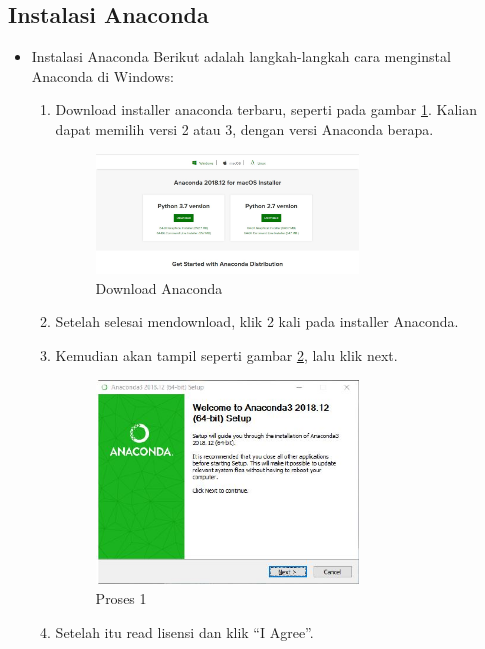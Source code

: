 \subsection{Instalasi Anaconda}
\begin{itemize}
\item Instalasi Anaconda
Berikut adalah langkah-langkah cara menginstal Anaconda di Windows:
\begin{enumerate}
\item Download installer anaconda terbaru, seperti pada gambar \ref{downloadanaconda}. Kalian dapat memilih versi 2 atau 3, dengan versi Anaconda berapa.
\begin{figure}[ht]
	\centerline{\includegraphics[width=0.70\textwidth]{figures/1/1154121/DownloadAnaconda.JPG}}
	\caption{Download Anaconda}
	\label{downloadanaconda}
\end{figure}	
\item Setelah selesai mendownload, klik 2 kali pada installer Anaconda.
\item Kemudian akan tampil seperti gambar \ref{gambar1}, lalu klik next.
\begin{figure}[ht]
	\centerline{\includegraphics[width=0.70\textwidth]{figures/1/1154121/a.JPG}}
	\caption{Proses 1 }
	\label{gambar1}
\end{figure}
\item Setelah itu read lisensi dan klik “I Agree”.
\begin{figure}[ht]

\end{figure}
\end{enumerate}
\end{itemize}
